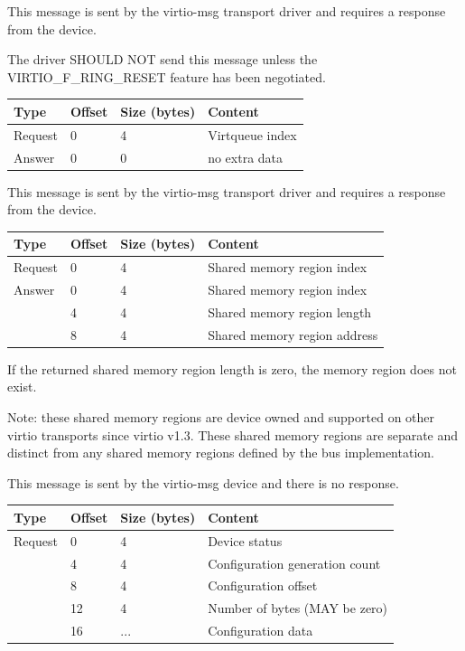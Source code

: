 This message is sent by the virtio-msg transport driver and requires a
response from the device.

The driver SHOULD NOT send this message unless the VIRTIO_F_RING_RESET
feature has been negotiated.

\begin{tabular}{|l|l|l|l|}
\hline
Type & Offset & Size (bytes) & Content \\
\hline \hline
Request & 0 & 4 & Virtqueue index \\
\hline
Answer & 0 & 0 & no extra data \\
\hline
\end{tabular}


This message is sent by the virtio-msg transport driver and requires a
response from the device.

\begin{tabular}{|l|l|l|l|}
\hline
Type & Offset & Size (bytes) & Content \\
\hline \hline
Request & 0 & 4 & Shared memory region index \\
\hline
Answer & 0 & 4 & Shared memory region index \\
& 4 & 4 & Shared memory region length \\
& 8 & 4 & Shared memory region address \\
\hline
\end{tabular}

If the returned shared memory region length is zero, the memory region does not
exist.

Note: these shared memory regions are device owned and supported on other virtio
transports since virtio v1.3. These shared memory regions are separate and
distinct from any shared memory regions defined by the bus implementation.


This message is sent by the virtio-msg device and there is no response.

\begin{tabular}{|l|l|l|l|}
\hline
Type & Offset & Size (bytes) & Content \\
\hline \hline
Request & 0 & 4 & Device status \\
& 4 & 4 & Configuration generation count \\
& 8 & 4 & Configuration offset \\
& 12 & 4 & Number of bytes (MAY be zero) \\
& 16 & ... & Configuration data \\
\hline
\end{tabular}

